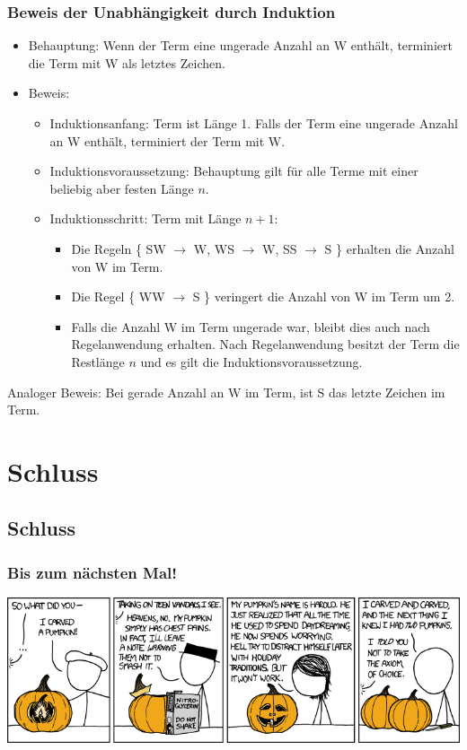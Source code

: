 \begin{frame}
	\frametitle{Beweis der Unabhängigkeit durch Induktion}
	\begin{itemize}
		\item Behauptung: Wenn der Term eine ungerade Anzahl an W enthält, terminiert die Term mit W als letztes Zeichen.
		\item Beweis:
			\begin{itemize}
			\item Induktionsanfang: Term ist Länge 1. Falls der Term eine ungerade Anzahl an W enthält, terminiert der Term mit W.
			\item Induktionsvoraussetzung: Behauptung gilt für alle Terme mit einer beliebig aber festen Länge $n$.
			\item Induktionsschritt: Term mit Länge $n + 1$:
			\begin{itemize}
				\item Die Regeln \{ SW $\rightarrow$ W, WS $\rightarrow$ W, SS $\rightarrow$ S \} erhalten die Anzahl von W im Term.
				\item Die Regel \{ WW $\rightarrow$ S \} veringert die Anzahl von W im Term um 2.
				\item Falls die Anzahl W im Term ungerade war, bleibt dies auch nach Regelanwendung erhalten. Nach Regelanwendung besitzt der Term die Restlänge $n$ und es gilt die Induktionsvoraussetzung.
			\end{itemize}
			\end{itemize}
	\end{itemize}
	Analoger Beweis: Bei gerade Anzahl an W im Term, ist S das letzte Zeichen im Term.
\end{frame}

\section{Schluss}
\subsection{Schluss}

\begin{frame}
\frametitle{Bis zum nächsten Mal!}
\vspace{-0.5cm}
\begin{center}
	\resizebox{11.85cm}{!} {%
	\includegraphics[height=0.8\textheight]{images/xkcd_804.png}%
	}
\end{center}
\end{frame}


